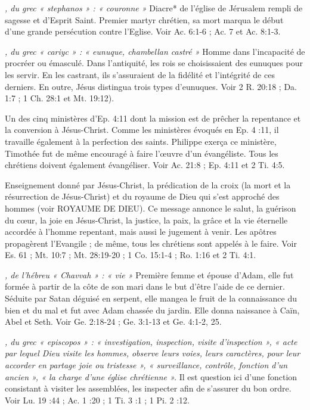 \begin{multicols}{2}
\textit{, du grec « stephanos » : « couronne »}\newline
Diacre* de l'église de Jérusalem rempli de sagesse et d'Esprit Saint. Premier martyr chrétien, sa mort marqua le début d'une grande persécution contre l'Eglise. Voir Ac. 6:1-6 ; Ac. 7 et Ac. 8:1-3.

\textit{, du grec « cariyc » : « eunuque, chambellan castré »}\newline
Homme dans l'incapacité de procréer ou émasculé. Dans l'antiquité, les rois se choisissaient des eunuques pour les servir. En les castrant, ils s'assuraient de la fidélité et l'intégrité de ces derniers. En outre, Jésus distingua trois types d'eunuques. Voir 2 R. 20:18 ; Da. 1:7 ; 1 Ch. 28:1 et Mt. 19:12).

\textit{}\newline
Un des cinq ministères d'Ep. 4:11 dont la mission est de prêcher la repentance et la conversion à Jésus-Christ. Comme les ministères évoqués en Ep. 4 :11, il travaille également à la perfection des saints. Philippe exerça ce ministère, Timothée fut de même encouragé à faire l'œuvre d'un évangéliste. Tous les chrétiens doivent également évangéliser. Voir Ac. 21:8 ; Ep. 4:11 et 2 Ti. 4:5.

\textit{}\newline
Enseignement donné par Jésus-Christ, la prédication de la croix (la mort et la résurrection de Jésus-Christ) et du royaume de Dieu qui s'est approché des hommes (voir ROYAUME DE DIEU). Ce message annonce le salut, la guérison du cœur, la joie en Jésus-Christ, la justice, la paix, la grâce et la vie éternelle accordée à l'homme repentant, mais aussi le jugement à venir. Les apôtres propagèrent l'Evangile ; de même, tous les chrétiens sont appelés à le faire. Voir Es. 61 ; Mt. 10:7 ; Mt. 28:19-20 ; 1 Co. 15:1-4 ; Ro. 1:16 et 2 Ti. 4:1.

\textit{, de l'hébreu « Chavvah » : « vie »}\newline
Première femme et épouse d'Adam, elle fut formée à partir de la côte de son mari dans le but d'être l'aide de ce dernier. Séduite par Satan déguisé en serpent, elle mangea le fruit de la connaissance du bien et du mal et fut avec Adam chassée du jardin. Elle donna naissance à Caïn, Abel et Seth. Voir Ge. 2:18-24 ; Ge. 3:1-13 et Ge. 4:1-2, 25.

\textit{, du grec « episcopos » : « investigation, inspection, visite d'inspection », « acte par lequel Dieu visite les hommes, observe leurs voies, leurs caractères, pour leur accorder en partage joie ou tristesse », « surveillance, contrôle, fonction d'un ancien », « la charge d'une église chrétienne ».}\newline
Il est question ici d'une fonction consistant à visiter les assemblées, les inspecter afin de s'assurer du bon ordre. Voir Lu. 19 :44 ; Ac. 1 :20 ; 1 Ti. 3 :1 ; 1 Pi. 2 :12.


\end{multicols}
